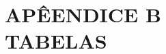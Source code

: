 \clearpage
\vspace*{\fill}
\section*{\centering APÊENDICE B \\ TABELAS}
\vspace*{\fill}
\clearpage
\newpage



